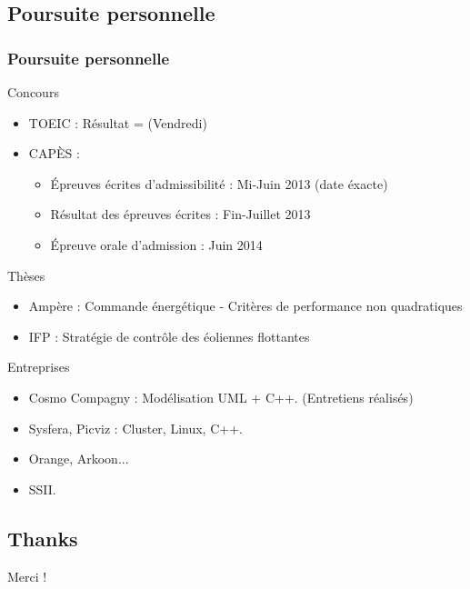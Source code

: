 \documentclass{beamer}
\begin{document}
\subsection{Poursuite personnelle}
\begin{frame}
\frametitle{Poursuite personnelle}
  \begin{block}{Concours}
      \begin{itemize}
        \item TOEIC : Résultat = (Vendredi)
        \item CAPÈS : 
          {
            \begin{itemize} 
              \item Épreuves écrites d'admissibilité : Mi-Juin 2013 (date éxacte)
              \item Résultat des épreuves écrites : Fin-Juillet 2013
              \item Épreuve orale d’admission : Juin 2014
            \end{itemize}
          }   
    \end{itemize} 
  \end{block}
  
  {
    \begin{block}{Thèses}
      \begin{itemize}
        \item Ampère : Commande énergétique - Critères de performance non quadratiques 
        \item IFP : Stratégie de contrôle des éoliennes flottantes
      \end{itemize} 
    \end{block}
  }
  {
    \begin{block}{Entreprises}
      \begin{itemize}
        \item Cosmo Compagny : Modélisation UML + C++. (Entretiens réalisés) 
        \item Sysfera, Picviz : Cluster, Linux, C++.
        \item Orange, Arkoon...
        \item SSII.
      \end{itemize} 
    \end{block}
  }
\end{frame}

\subsection{Thanks}
\begin{frame}
  \begin{block}{}
    \begin{center}
      Merci !
    \end{center}
    
    
  \end{block}
\end{frame}

\end{document}
